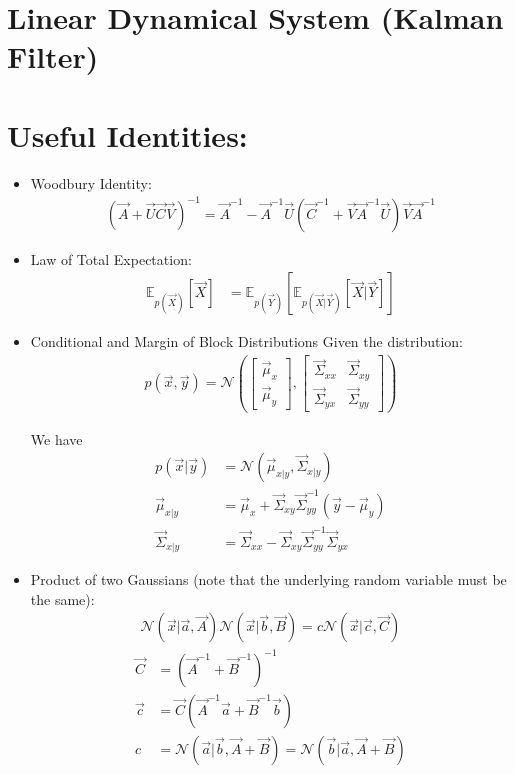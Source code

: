 \documentclass[12pt,twoside]{article}
\begin{document}
\section{Linear Dynamical System (Kalman Filter)}


\section{Useful Identities:}

\begin{itemize}
\item Woodbury Identity:
	\begin{align*}
		(\vec{A} + \vec{U}\vec{C}\vec{V})^{-1} = \vec{A}^{-1}-\vec{A}^{-1} \vec{U}(\vec{C}^{-1}+\vec{V}\vec{A}^{-1}\vec{U})\vec{V}\vec{A}^{-1}
	\end{align*}

\item Law of Total Expectation:
	\begin{align*}
		\mathbb{E}_{p(\vec{X})}[\vec{X}] & =\mathbb{E}_{p(\vec{Y})}[\mathbb{E}_{p(\vec{X}\vert\vec{Y})}[\vec{X}\vert \vec{Y}]] 
	\end{align*}


\item Conditional and Margin of Block Distributions
Given the distribution:
\begin{align*}
	p(\vec{x},\vec{y}) = \mathcal{N}\left(
	\begin{bmatrix}
	\vec{\mu}_x\\
	\vec{\mu}_y
	\end{bmatrix},
	\begin{bmatrix}
	\vec{\Sigma}_{xx}	& \vec{\Sigma}_{xy}\\
	\vec{\Sigma}_{yx}	& \vec{\Sigma}_{yy}
	\end{bmatrix}
	\right)
\end{align*}

We have
\begin{align*}
	p(\vec{x}\vert \vec{y})
	& = \mathcal{N}\left(\vec{\mu}_{x\vert y}, \vec{\Sigma}_{x\vert y}\right)\\
	\vec{\mu}_{x\vert y}
	&=\vec{\mu}_x+ \vec{\Sigma}_{xy}\vec{\Sigma}_{yy}^{-1}(\vec {y} - \vec{\mu}_y)\\
	\vec{\Sigma}_{x\vert y}
	&=\vec{\Sigma}_{xx} - \vec{\Sigma}_{xy}\vec{\Sigma}_{yy}^{-1}\vec{\Sigma}_{yx}
\end{align*}

\item Product of two Gaussians (note that the underlying random variable must be the same):
	\begin{align*}
		\mathcal{N}(\vec{x}\vert \vec{a}, \vec{A})\mathcal{N}(\vec{x}\vert \vec{b}, \vec{B})= c\mathcal{N}(\vec{x}\vert \vec{c}, \vec{C})
	\end{align*}
	\begin{align*}
		\vec{C} &= (\vec{A}^{-1}+\vec{B}^{-1})^{-1}\\
		\vec{c} &= \vec{C}(\vec{A}^{-1}\vec{a}+\vec{B}^{-1}\vec{b})\\
		c& = \mathcal{N}(\vec{a}\vert \vec{b}, \vec{A} + \vec{B}) = \mathcal{N}(\vec{b}\vert \vec{a}, \vec{A} + \vec{B})
	\end{align*}


\end{itemize}
\end{document}

